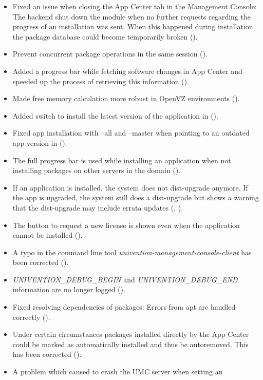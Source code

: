 \begin{itemize}
\item Fixed an issue when closing the App Center tab in the Management Console:
  The backend shut down the module when no further requests regarding the
  progress of an installation was sent. When this happened during installation
  the package database could become temporarily broken ().
\item Prevent concurrent package operations in the same session
  ().
\item Added a progress bar while fetching software changes in App Center and
  speeded up the process of retrieving this information ().
\item Made free memory calculation more robust in OpenVZ environments
  ().
\item Added switch to install the latest version of the application in
   ().
\item Fixed app installation with --all and --master when pointing to an
  outdated app version in  ().
\item The full progress bar is used while installing an application when not
  installing packages on other servers in the domain ().
\item If an application is installed, the system does not dist-upgrade anymore.
  If the app is upgraded, the system still does a dist-upgrade but shows a
  warning that the dist-upgrade may include errata updates (,
  ).
\item The button to request a new license is shown even when the application
  cannot be installed ().
\item A typo in the command line tool
  \emph{univention-management-console-client} has been corrected
  ().
\item \emph{UNIVENTION\_DEBUG\_BEGIN} and \emph{UNIVENTION\_DEBUG\_END}
  information are no longer logged ().
\item Fixed resolving dependencies of packages: Errors from apt are handled
  correctly ().
\item Under certain circumstances packages installed directly by the App Center
  could be marked as automatically installed and thus be autoremoved. This has
  been corrected ().
\item A problem which caused to crash the UMC server when setting an

\end{itemize}
